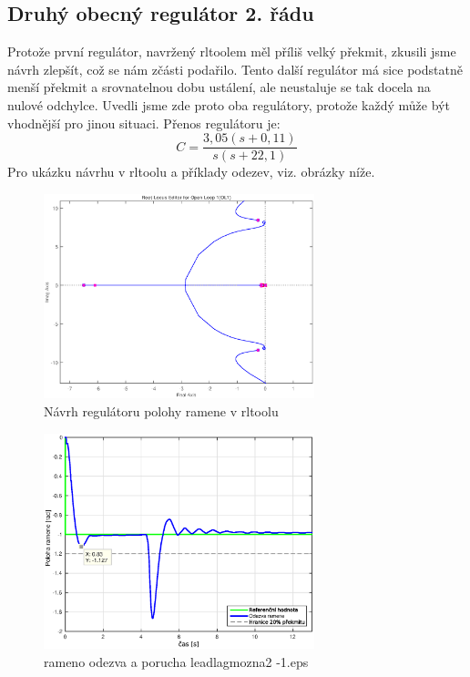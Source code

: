 \documentclass[11pt,a4paper]{article}
\begin{document}
\subsection{Druhý obecný regulátor 2. řádu}
Protože první regulátor, navržený rltoolem měl příliš velký překmit, zkusili jsme návrh zlepšít, což se nám zčásti podařilo. Tento další regulátor má sice podstatně menší překmit a srovnatelnou dobu ustálení, ale neustaluje se tak docela na nulové odchylce. Uvedli jsme zde proto oba regulátory, protože každý může být vhodnější pro jinou situaci. Přenos regulátoru je:
$$
C = \frac{3,05 (s+0,11)}{s (s+22,1)}
$$
\newline
Pro ukázku návrhu v rltoolu a příklady odezev, viz. obrázky níže.
\begin{figure}[H]
\centering
\includegraphics[width=0.7\textwidth]{rltool_rameno2.eps}
\caption{Návrh regulátoru polohy ramene v rltoolu}
\label{ram_rltool2}
\end{figure}
\begin{figure}[H]
\centering
\includegraphics[width=0.7\textwidth]{dobre_grafy/rameno_odezva_a_porucha_leadlagmozna2_-1.eps}
\caption{rameno odezva a porucha leadlagmozna2 -1.eps}
\label{ram_ob2}
\end{figure}
\end{document}
